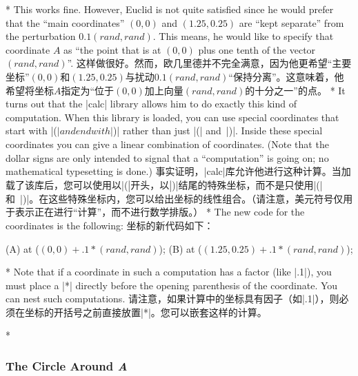 \begin{paracol}{2}
\switchcolumn[0]*%
This works fine. However, Euclid is not quite satisfied since he would prefer
that the ``main coordinates'' $(0,0)$ and $(1.25,0.25)$ are ``kept separate''
from the perturbation $0.1(\mathit{rand},\mathit{rand})$. This means, he would
like to specify that coordinate $A$ as ``the point that is at $(0,0)$ plus one
tenth of the vector  $(\mathit{rand},\mathit{rand})$''.
\switchcolumn
这样做很好。然而，欧几里德并不完全满意，因为他更希望“主要坐标”$(0,0)$和$(1.25,0.25)$与扰动$0.1(\mathit{rand},\mathit{rand})$“保持分离”。这意味着，他希望将坐标$A$指定为“位于$(0,0)$加上向量$(\mathit{rand},\mathit{rand})$的十分之一”的点。
\switchcolumn[0]*%
It turns out that the |calc| library allows him to do exactly this kind of
computation. When this library is loaded, you can use special coordinates that
start with |($| and end with |$)| rather than just |(| and~|)|. Inside these
special coordinates you can give a linear combination of coordinates. (Note
that the dollar signs are only intended to signal that a ``computation'' is
going on; no mathematical typesetting is done.)
\switchcolumn
事实证明，|calc|库允许他进行这种计算。当加载了该库后，您可以使用以|($|开头，以|$)|结尾的特殊坐标，而不是只使用|(|和~|)|。在这些特殊坐标内，您可以给出坐标的线性组合。（请注意，美元符号仅用于表示正在进行“计算”，而不进行数学排版。）
\switchcolumn[0]*%
The new code for the coordinates is the following:
\switchcolumn
坐标的新代码如下：
%
\switchcolumn[1]\begin{codeexample}
\coordinate [...] (A) at ($ (0,0) + .1*(rand,rand) $);
\coordinate [...] (B) at ($ (1.25,0.25) + .1*(rand,rand) $);
\end{codeexample}
\switchcolumn[0]*%
Note that if a coordinate in such a computation has a factor (like |.1|), you
must place a |*| directly before the opening parenthesis of the coordinate. You
can nest such computations.
\switchcolumn
请注意，如果计算中的坐标具有因子（如|.1|），则必须在坐标的开括号之前直接放置|*|。您可以嵌套这样的计算。

\switchcolumn[0]*%
\subsubsection{The Circle Around \emph{A}}
\switchcolumn

\end{paracol}
